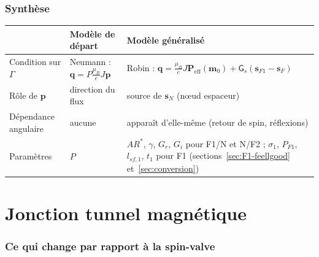 \documentclass[11pt,a4paper]{article}
\newcommand{\vm}{\bm{m}}
\newcommand{\vp}{\bm{p}}
\newcommand{\vs}{\bm{s}}
\newcommand{\vq}{\bm{q}}
\newcommand{\mG}{\mathsf{G}}
\begin{document}
\section*{Synthèse}

\begin{center}
\renewcommand{\arraystretch}{1.3}
\begin{tabular}{>{\raggedright}p{3.2cm}>{\raggedright}p{4.8cm}>{\raggedright\arraybackslash}p{5.6cm}}
  \toprule
  & \textbf{Modèle de départ} & \textbf{Modèle généralisé} \\
  \midrule
  Condition sur $\Gamma$ & Neumann : $\vq = P\frac{\mu_B}{e}J\vp$
    & Robin : $\vq = \frac{\mu_B}{e}J\bm{P}_{\!\mathrm{eff}}(\vm_0)
      + \mG_s(\vs_{F1}-\vs_F)$ \\
  Rôle de $\vp$ & direction du flux & source de $\vs_N$ (nœud espaceur) \\
  Dépendance angulaire & aucune
    & apparaît d'elle-même (retour de spin, réflexions) \\
  Paramètres & $P$
    & $AR^*$, $\gamma$, $G_r$, $G_i$ pour F1/N et N/F2 ;
      $\sigma_1$, $P_{F1}$, $l_{sf,1}$, $t_1$ pour F1
      (sections~\ref{sec:F1-feellgood} et~\ref{sec:conversion}) \\
  \bottomrule
\end{tabular}
\end{center}

\part{Jonction tunnel magnétique}
\label{part:tunnel}

\section{Ce qui change par rapport à la spin-valve}
\end{document}
